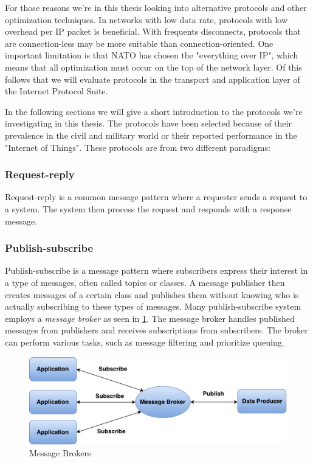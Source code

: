 For those reasons we're in this thesis looking into alternative protocols and
other optimization techniques. In networks with low data rate, protocols with
low overhead per IP packet is beneficial. With frequents disconnects, protocols
that are connection-less may be more suitable than connection-oriented. One
important limitation is that NATO has chosen the "everything over IP", which
means that all optimization must occur on the top of the network layer. Of this
follows that we will evaluate protocols in the transport and application layer
of the Internet Protocol Suite.

In the following sections we will give a short
introduction to the protocols we're investigating in this thesis. The protocols
have been selected because of their prevalence in the civil and military world
or their reported performance in the "Internet of Things". These protocols are
from two different paradigms:

\subsubsection{Request-reply}

Request-reply is a common message pattern where a requester sends a request to a
system. The system then process the request and responds with a response
message.

\subsubsection{Publish-subscribe}

Publish-subscribe is a message pattern where subscribers express their interest
in a type of messages, often called topics or classes. A message publisher then
creates messages of a certain class and publishes them without knowing who is
actually subscribing to these types of messages. Many publish-subscribe system
employs a \textit{message broker} as seen in \cref{figure-message-brokers}. The
message broker handles published messages from publishers and receives
subscriptions from subscribers. The broker can perform various tasks, such as
message filtering and prioritize queuing.

\begin{figure}[h]
\centering
\includegraphics[scale=0.6]{images/pubsub.pdf}
\caption{Message Brokers}
\label{figure-message-brokers}
\end{figure}


